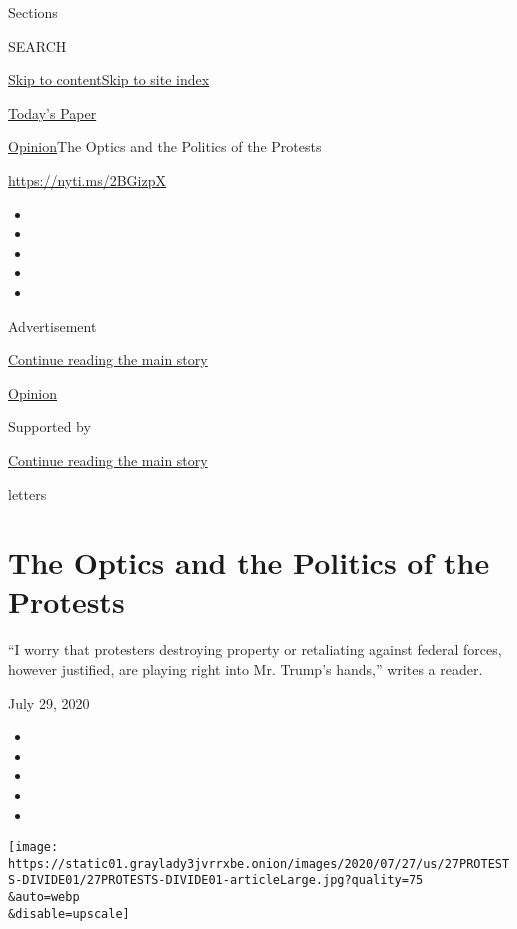 Sections

SEARCH

\protect\hyperlink{site-content}{Skip to
content}\protect\hyperlink{site-index}{Skip to site index}

\href{https://myaccount.nytimes3xbfgragh.onion/auth/login?response_type=cookie\&client_id=vi}{}

\href{https://www.nytimes3xbfgragh.onion/section/todayspaper}{Today's
Paper}

\href{/section/opinion}{Opinion}\textbar{}The Optics and the Politics of
the Protests

\url{https://nyti.ms/2BGizpX}

\begin{itemize}
\item
\item
\item
\item
\item
\end{itemize}

Advertisement

\protect\hyperlink{after-top}{Continue reading the main story}

\href{/section/opinion}{Opinion}

Supported by

\protect\hyperlink{after-sponsor}{Continue reading the main story}

letters

\hypertarget{the-optics-and-the-politics-of-the-protests}{%
\section{The Optics and the Politics of the
Protests}\label{the-optics-and-the-politics-of-the-protests}}

``I worry that protesters destroying property or retaliating against
federal forces, however justified, are playing right into Mr. Trump's
hands,'' writes a reader.

July 29, 2020

\begin{itemize}
\item
\item
\item
\item
\item
\end{itemize}

\texttt{[image: https://static01.graylady3jvrrxbe.onion/images/2020/07/27/us/27PROTESTS-DIVIDE01/27PROTESTS-DIVIDE01-articleLarge.jpg?quality=75\\\&auto=webp\\\&disable=upscale]}

